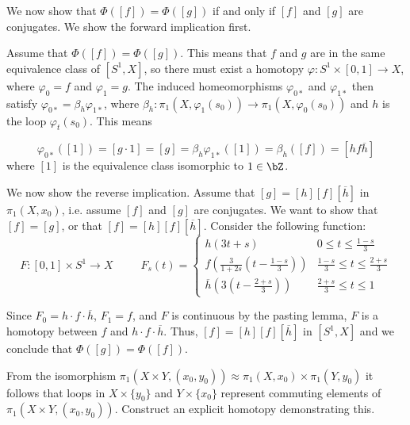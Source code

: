\begin{homework}[e]
\begin{prf}
\bigskip

We now show that $\Phi([f]) = \Phi([g])$ if and only if $[f]$ and $[g]$ are conjugates. We show the forward implication first.

Assume that $\Phi([f]) = \Phi([g])$. This means that $f$ and $g$ are in the same equivalence class of $[S^1, X]$, so there must exist a homotopy $\varphi : S^1 \times [0,1] \rightarrow X$, where $\varphi_0 = f$ and $\varphi_1 = g$. The induced homeomorphisms $\varphi_{0*}$ and $\varphi_{1*}$ then satisfy $\varphi_{0*} = \beta_h \varphi_{1*}$, where $\beta_h : \pi_1(X, \varphi_1(s_0)) \rightarrow \pi_1(X, \varphi_0(s_0))$ and $h$ is the loop $\varphi_t(s_0)$. This means 

\begin{equation*}
    \varphi_{0*}([1]) = [g \cdot 1] = [g] = \beta_h\varphi_{1*}([1]) = \beta_h([f]) = [hf\overline{h}]
\end{equation*}
where $[1]$ is the equivalence class isomorphic to $1 \in \bZ$.

\bigskip

We now show the reverse implication. Assume that $[g] = [h][f][\overline{h}]$ in $\pi_1(X, x_0)$, i.e. assume $[f]$ and $[g]$ are conjugates. We want to show that $[f] = [g]$, or that $[f] = [h][f][\overline{h}]$. Consider the following function:
\begin{equation*}
    F: [0,1] \times S^1 \rightarrow X 
    \hspace{30pt}
    F_s(t) = 
    \begin{cases}
        h(3t + s) & 0 \leq t \leq \frac{1-s}{3} \\
        f\left(\frac{3}{1+2s}(t - \frac{1 - s}{3})\right) & \frac{1 - s}{3} \leq t \leq \frac{2+s}{3} \\
        \overline{h}\left(3(t - \frac{2 + s}{3})\right) & \frac{2 + s}{3} \leq t \leq 1
    \end{cases}
\end{equation*}

Since $F_0 = h \cdot f \cdot \overline{h}$, $F_1 = f$, and $F$ is continuous by the pasting lemma, $F$ is a homotopy between $f$ and $h \cdot f \cdot \overline{h}$. Thus, $[f] = [h][f][\overline{h}]$ in $[S^1, X]$ and we conclude that $\Phi([g]) = \Phi([f])$.

\end{prf}
From the isomorphism $\pi_1(X\times Y, (x_0,y_0)) \approx \pi_1(X,x_0) \times \pi_1(Y,y_0)$ it follows that loops in $X \times \{y_0\}$ and $Y \times \{x_0\}$ represent commuting elements of $\pi_1\left(X \times Y, (x_0,y_0)\right)$. Construct an explicit homotopy demonstrating this.


\end{homework}
